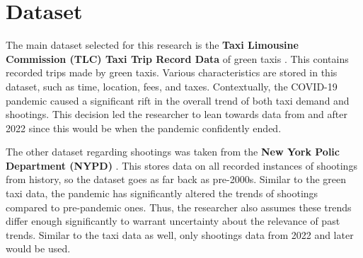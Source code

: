 \documentclass[11pt]{article}
\begin{document}
\section{Dataset}

The main dataset selected for this research is the \textbf{Taxi Limousine Commission (TLC) Taxi Trip Record Data} of green taxis \cite{tlc}. This contains recorded trips made by green taxis. Various characteristics are stored in this dataset, such as time, location, fees, and taxes. Contextually, the COVID-19 pandemic caused a significant rift in the overall trend of both taxi demand and shootings. This decision led the researcher to lean towards data from and after 2022 since this would be when the pandemic confidently ended.

The other dataset regarding shootings was taken from the \textbf{New York Polic Department (NYPD)} \cite{nypdshootings}. This stores data on all recorded instances of shootings from history, so the dataset goes as far back as pre-2000s. Similar to the green taxi data, the pandemic has significantly altered the trends of shootings compared to pre-pandemic ones. Thus, the researcher also assumes these trends differ enough significantly to warrant uncertainty about the relevance of past trends. Similar to the taxi data as well, only shootings data from 2022 and later would be used.
\end{document}
